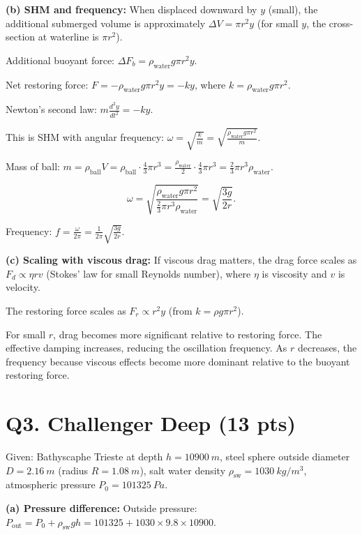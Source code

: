 \documentclass[11pt]{article}
\newcommand{\ans}[1]{\boxed{\displaystyle #1}}
\begin{document}
\textbf{(b) SHM and frequency:} When displaced downward by $y$ (small), the additional submerged volume is approximately $\Delta V = \pi r^2 y$ (for small $y$, the cross-section at waterline is $\pi r^2$).

Additional buoyant force: $\Delta F_b = \rho_{\text{water}} g \pi r^2 y$.

Net restoring force: $F = -\rho_{\text{water}} g \pi r^2 y = -ky$, where $k = \rho_{\text{water}} g \pi r^2$.

Newton's second law: $m \frac{d^2y}{dt^2} = -ky$.

This is SHM with angular frequency: $\omega = \sqrt{\frac{k}{m}} = \sqrt{\frac{\rho_{\text{water}} g \pi r^2}{m}}$.

Mass of ball: $m = \rho_{\text{ball}} V = \rho_{\text{ball}} \cdot \frac{4}{3}\pi r^3 = \frac{\rho_{\text{water}}}{2} \cdot \frac{4}{3}\pi r^3 = \frac{2}{3}\pi r^3 \rho_{\text{water}}$.

\[ \omega = \sqrt{\frac{\rho_{\text{water}} g \pi r^2}{\frac{2}{3}\pi r^3 \rho_{\text{water}}}} = \sqrt{\frac{3g}{2r}}. \]

Frequency: $f = \frac{\omega}{2\pi} = \ans{\frac{1}{2\pi}\sqrt{\frac{3g}{2r}}}$.

\textbf{(c) Scaling with viscous drag:} If viscous drag matters, the drag force scales as $F_d \propto \eta r v$ (Stokes' law for small Reynolds number), where $\eta$ is viscosity and $v$ is velocity.

The restoring force scales as $F_r \propto r^2 y$ (from $k = \rho g \pi r^2$).

For small $r$, drag becomes more significant relative to restoring force. The effective damping increases, reducing the oscillation frequency. As $r$ decreases, the frequency \ans{decreases} because viscous effects become more dominant relative to the buoyant restoring force.

\section*{Q3. Challenger Deep (13 pts)}
Given: Bathyscaphe Trieste at depth $h = \SI{10900}{m}$, steel sphere outside diameter $D = \SI{2.16}{m}$ (radius $R = \SI{1.08}{m}$), salt water density $\rho_{\text{sw}} = \SI{1030}{kg/m^3}$, atmospheric pressure $P_0 = \SI{101325}{Pa}$.

\textbf{(a) Pressure difference:} Outside pressure: $P_{\text{out}} = P_0 + \rho_{\text{sw}} g h = 101325 + 1030 \times 9.8 \times 10900$.
\end{document}
